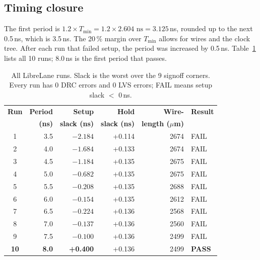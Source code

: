 \documentclass[10pt,a4paper,twocolumn]{article}
\newcommand{\Tmin}{$T_{\min}$}
\begin{document}
\subsection{Timing closure}
The first period is $1.2 \times T_{\min} = 1.2 \times 2.604\text{ ns} = 3.125$\,ns, rounded up to the next 0.5\,ns, which is 3.5\,ns. The 20\,\% margin over \Tmin{} allows for wires and the clock tree. After each run that failed setup, the period was increased by 0.5\,ns. Table~\ref{tab:runs} lists all 10 runs; 8.0\,ns is the first period that passes.

\begin{table}[!htbp]
\centering\footnotesize
\begin{tabular}{crrrrl}
\toprule
\textbf{Run} & \textbf{Period} & \textbf{Setup} & \textbf{Hold} & \textbf{Wire-} & \textbf{Result} \\
 & \textbf{(ns)} & \textbf{slack (ns)} & \textbf{slack (ns)} & \textbf{length ($\mu$m)} & \\
\midrule
1 & 3.5 & $-2.184$ & +0.114 & 2674 & FAIL \\
2 & 4.0 & $-1.684$ & +0.133 & 2674 & FAIL \\
3 & 4.5 & $-1.184$ & +0.135 & 2675 & FAIL \\
4 & 5.0 & $-0.682$ & +0.135 & 2675 & FAIL \\
5 & 5.5 & $-0.208$ & +0.135 & 2688 & FAIL \\
6 & 6.0 & $-0.154$ & +0.135 & 2612 & FAIL \\
7 & 6.5 & $-0.224$ & +0.136 & 2568 & FAIL \\
8 & 7.0 & $-0.137$ & +0.136 & 2560 & FAIL \\
9 & 7.5 & $-0.100$ & +0.136 & 2499 & FAIL \\
\textbf{10} & \textbf{8.0} & \textbf{+0.400} & +0.136 & 2499 & \textbf{PASS} \\
\bottomrule
\end{tabular}
\caption{All LibreLane runs. Slack is the worst over the 9 signoff corners. Every run has 0 DRC errors and 0 LVS errors; FAIL means setup slack $<$ 0\,ns.}
\label{tab:runs}
\end{table}
\end{document}

